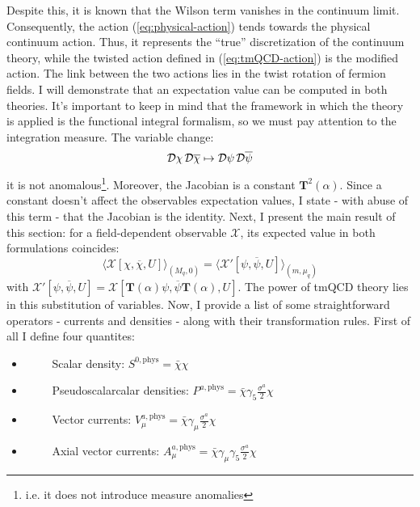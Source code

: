 \documentclass[english, LaM, oneside, noexaminfo]{sapthesis}
\newcommand{\la}{\langle}
\newcommand{\ra}{\rangle}
\begin{document}
Despite this, it is known \cite{montvay-munster} that the Wilson term vanishes in the continuum limit.
Consequently, the action (\ref{eq:physical-action}) tends towards the physical continuum action.
Thus, it represents the ``true'' discretization of the continuum theory, while the twisted action defined in (\ref{eq:tmQCD-action}) is the modified action.
\newline
The link between the two actions lies in the twist rotation of fermion fields.
I will demonstrate that an expectation value can be computed in both theories.
It's important to keep in mind that the framework in which the theory is applied is the functional integral formalism, so we must pay attention to the integration measure.
The variable change:
\begin{equation*}
    \mathcal{D}\chi \hspace*{0.5mm} \mathcal{D}\overline{\chi} \mapsto \mathcal{D}\psi \hspace*{0.5mm} \mathcal{D}\overline{\psi}
\end{equation*}
it is not anomalous\footnote{i.e. it does not introduce measure anomalies}.
Moreover, the Jacobian is a constant $\mathbf{T}^2(\alpha)$.
Since a constant doesn't affect the observables expectation values, I state - with abuse of this term - that the Jacobian is the identity.
Next, I present the main result of this section: for a field-dependent observable $\mathcal{X}$, its expected value in both formulations coincides:
\begin{equation*}
    \la \mathcal{X} [\chi, \overline{\chi}, U] \ra_{(M_q,0)} = \la \mathcal{X}' [\psi, \overline{\psi}, U] \ra_{(m,\mu_q)}
\end{equation*}
with $\mathcal{X}' [\psi, \overline{\psi}, U] = \mathcal{X} [\mathbf{T}(\alpha)\psi, \overline{\psi}\mathbf{T}(\alpha), U]$.
The power of tmQCD theory lies in this substitution of variables.
\newline
Now, I provide a list of some straightforward operators - currents and densities - along with their transformation rules.
First of all I define four quantites:
\begin{itemize}
    \item [] $\qquad$ Scalar density: \hspace*{5mm} $S^{0,\text{phys}} = \bar\chi \chi$
    \item [] $\qquad$ Pseudoscalarcalar densities: \hspace*{5mm} $P^{a,\text{phys}} = \bar\chi \gamma_5 \frac{\sigma^a}{2} \chi$
    \item [] $\qquad$ Vector currents: \hspace*{5mm} $V_{\mu}^{a,\text{phys}} = \bar\chi \gamma_\mu \frac{\sigma^a}{2} \chi$
    \item [] $\qquad$ Axial vector currents: \hspace*{5mm} $A_\mu^{a,\text{phys}} = \bar\chi \gamma_\mu \gamma_5 \frac{\sigma^a}{2} \chi$
\end{itemize}
\end{document}
